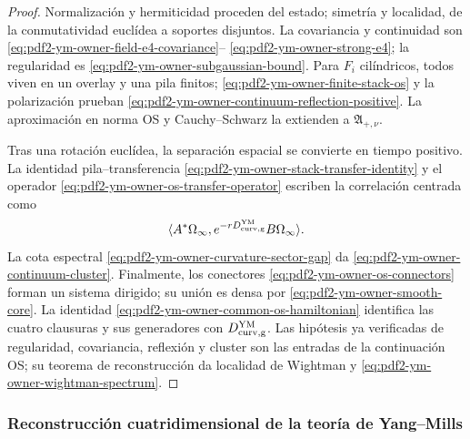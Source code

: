 \begin{proof}
Normalización y hermiticidad proceden del estado; simetría y localidad, de la
conmutatividad euclídea a soportes disjuntos. La covariancia y continuidad son
\eqref{eq:pdf2-ym-owner-field-e4-covariance}--
\eqref{eq:pdf2-ym-owner-strong-e4}; la regularidad es
\eqref{eq:pdf2-ym-owner-subgaussian-bound}. Para
$F_i$ cilíndricos, todos viven en un overlay y una pila finitos;
\eqref{eq:pdf2-ym-owner-finite-stack-os} y la polarización prueban
\eqref{eq:pdf2-ym-owner-continuum-reflection-positive}. La aproximación en norma OS
y Cauchy--Schwarz la extienden a $\mathfrak A_{+,\nu}$.

Tras una rotación euclídea, la separación espacial se convierte en tiempo positivo.
La identidad pila--transferencia
\eqref{eq:pdf2-ym-owner-stack-transfer-identity} y el operador
\eqref{eq:pdf2-ym-owner-os-transfer-operator} escriben la correlación centrada como
\[
 \langle A^*\Omega_\infty,
 e^{-rD_{\rm curv,g}^{\rm YM}}B\Omega_\infty\rangle.
\]
La cota espectral \eqref{eq:pdf2-ym-owner-curvature-sector-gap} da
\eqref{eq:pdf2-ym-owner-continuum-cluster}. Finalmente, los conectores
\eqref{eq:pdf2-ym-owner-os-connectors} forman un sistema dirigido; su unión es densa
por \eqref{eq:pdf2-ym-owner-smooth-core}. La identidad
\eqref{eq:pdf2-ym-owner-common-os-hamiltonian} identifica las cuatro clausuras y sus
generadores con $D_{\rm curv,g}^{\rm YM}$. Las hipótesis ya verificadas de regularidad,
covariancia, reflexión y cluster son las entradas de la continuación OS; su teorema de
reconstrucción da localidad de Wightman y
\eqref{eq:pdf2-ym-owner-wightman-spectrum}.
\end{proof}

\subsubsection{Reconstrucción cuatridimensional de la teoría de Yang--Mills}

